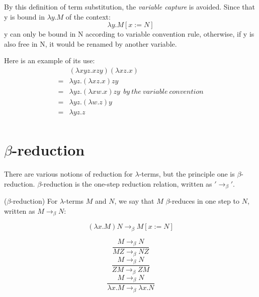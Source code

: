 By this definition of term substitution, the \textit{variable capture} is avoided. Since that y is bound in $\lambda y.M$ of the context:
\begin{equation*}
\lambda y.M[x:=N]
\end{equation*}
y can only be bound in N according to variable convention rule, otherwise, if y is also free in N, it would be renamed by another variable. 

Here is an example of its use:
\begin{equation*}
\begin{array}{ll}
&(\lambda xyz.xzy)(\lambda xz.x)\\
=& \lambda yz.(\lambda xz.x)zy \\
=& \lambda yz.(\lambda xw.x)zy\ \ by\ the\ variable\ convention \\
=& \lambda yz.(\lambda w.z)y\\
=& \lambda yz.z\\
\end{array}
\end{equation*}

\section{$\beta$-reduction}

\noindent There are various notions of reduction for $\lambda$-terms, but the principle one is $\beta$-reduction. $\beta$-reduction is the one-step reduction relation, written as $'\rightarrow _\beta'$. 

\begin{def1}
($\beta$-reduction) For $\lambda$-terms $M$ and $N$, we say that $M$ $\beta$-reduces in one step to $N$, written as $M \rightarrow _\beta N$:
\end{def1}
\begin{equation*}
(\lambda x.M)N\rightarrow _\beta M[x:=N]
\end{equation*}

\begin{equation*}
\frac{M\rightarrow _\beta N}{MZ \rightarrow _\beta NZ}
\end{equation*}
\begin{equation*}
\frac{M\rightarrow _\beta N}{ZM \rightarrow _\beta ZM}
\end{equation*}
\begin{equation*}
\frac{M\rightarrow _\beta N}{\lambda x.M \rightarrow _\beta \lambda x.N}
\end{equation*}

